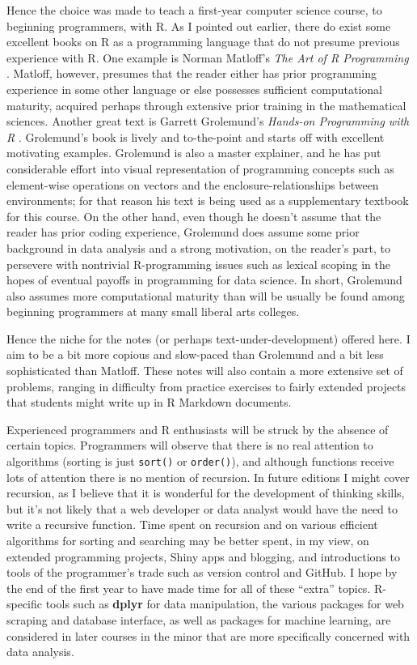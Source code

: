 \documentclass[]{book}
\theoremstyle{definition}
\theoremstyle{definition}
\theoremstyle{remark}
\begin{document}
Hence the choice was made to teach a first-year computer science course,
to beginning programmers, with R. As I pointed out earlier, there do
exist some excellent books on R as a programming language that do not
presume previous experience with R. One example is Norman Matloff's
\emph{The Art of R Programming} \citep{Matloff2011}. Matloff, however,
presumes that the reader either has prior programming experience in some
other language or else possesses sufficient computational maturity,
acquired perhaps through extensive prior training in the mathematical
sciences. Another great text is Garrett Grolemund's \emph{Hands-on
Programming with R} \citep{Grolemund2014}. Grolemund's book is lively
and to-the-point and starts off with excellent motivating examples.
Grolemund is also a master explainer, and he has put considerable effort
into visual representation of programming concepts such as element-wise
operations on vectors and the enclosure-relationships between
environments; for that reason his text is being used as a supplementary
textbook for this course. On the other hand, even though he doesn't
assume that the reader has prior coding experience, Grolemund does
assume some prior background in data analysis and a strong motivation,
on the reader's part, to persevere with nontrivial R-programming issues
such as lexical scoping in the hopes of eventual payoffs in programming
for data science. In short, Grolemund also assumes more computational
maturity than will be usually be found among beginning programmers at
many small liberal arts colleges.

Hence the niche for the notes (or perhaps text-under-development)
offered here. I aim to be a bit more copious and slow-paced than
Grolemund and a bit less sophisticated than Matloff. These notes will
also contain a more extensive set of problems, ranging in difficulty
from practice exercises to fairly extended projects that students might
write up in R Markdown documents.

Experienced programmers and R enthusiasts will be struck by the absence
of certain topics. Programmers will observe that there is no real
attention to algorithms (sorting is just \texttt{sort()} or
\texttt{order()}), and although functions receive lots of attention
there is no mention of recursion. In future editions I might cover
recursion, as I believe that it is wonderful for the development of
thinking skills, but it's not likely that a web developer or data
analyst would have the need to write a recursive function. Time spent on
recursion and on various efficient algorithms for sorting and searching
may be better spent, in my view, on extended programming projects, Shiny
apps and blogging, and introductions to tools of the programmer's trade
such as version control and GitHub. I hope by the end of the first year
to have made time for all of these ``extra'' topics. R-specific tools
such as \textbf{dplyr} for data manipulation, the various packages for
web scraping and database interface, as well as packages for machine
learning, are considered in later courses in the minor that are more
specifically concerned with data analysis.
\end{document}

